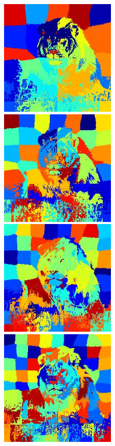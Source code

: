 \documentclass{article}
\begin{document}
\begin{figure}[h!]
  \centering
	\includegraphics[height=15em]{code/outputs/prob1b_spatial_weight_1.0/prob1b_25.jpg}
	\includegraphics[height=15em]{code/outputs/prob1b_spatial_weight_1.0/prob1b_49.jpg}
	\includegraphics[height=15em]{code/outputs/prob1b_spatial_weight_1.0/prob1b_64.jpg}
	\includegraphics[height=15em]{code/outputs/prob1b_spatial_weight_1.0/prob1b_81.jpg}

\end{figure}
\end{document}

